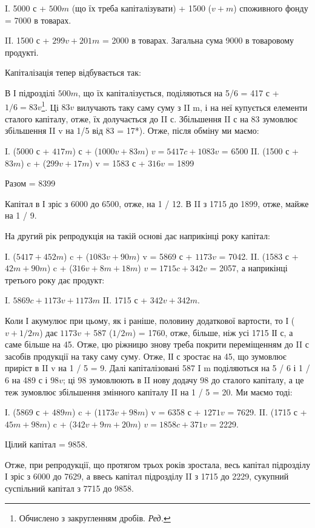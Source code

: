 I.  5000 с + $500 m$ (що їх треба капіталізувати) + 1500 ($v + m$) споживного
фонду = 7000 в товарах.

II.    1500 с + $299 v + 201 m$ = 2000 в товарах. Загальна сума 9000 в
товаровому продукті.

Капіталізація тепер відбувається так:

В І підрозділі $500 m$, що їх капіталізується, поділяються на 5/6 =
417 с + $1 / 6 = 83 v$\footnote*{
Обчислено з закругленням дробів. \emph{Ред.}
}. Ці $83 v$ вилучають таку саму суму з II m, і на
неї купується елементи сталого капіталу, отже, їх долучається до II с.
Збільшення II с на 83 зумовлює збільшення II v на 1/5 від 83 = 17*).
Отже, після обміну ми маємо:

I. (5000 с + $417 m$) с + ($1000 v + 83 m$) $v = 5417 c + 1083 v$ = 6500
II. (1500 с + $83 m$) c + ($299 v + 17 m$) v = 1583 с + $316 v$ = 1899

Разом = 8399

Капітал в І зріс з 6000 до 6500, отже, на 1 / 12. В II з 1715 до 1899,
отже, майже на 1 / 9.

На другий рік репродукція на такій основі дає наприкінці року
капітал:

І. ($5417 + 452 m$) c + ($1083 v + 90 m$) v = 5869 с + $1173 v$ = 7042.
II. (1583 с + $42 m + 90 m$) c + ($316 v + 8m + 18 m$) $v = 1715 c + 342 v$ =
2057,
а наприкінці третього року дає продукт:

I. $5869 c + 1173 v + 1173 m$
II. 1715 с + $342 v + 342 m$.

Коли І акумулює при цьому, як і раніше, половину додаткової вартости,
то І ($v + 1 / 2 m$) дає $1173 v$ + 587 ($1 / 2 m$) = 1760, отже, більше,
ніж усі 1715 ІІ с, а саме більше на 45. Отже, цю ріжницю знову треба
покрити переміщенням до II с засобів продукції на таку саму суму. Отже,
ІІ с зростає на 45, що зумовлює приріст в II v на 1 / 5 = 9. Далі капіталізовані
587 I m поділяються на 5 / 6 і 1 / 6 на 489 с і $98 v$; ці 98 зумовлюють
в II нову додачу 98 до сталого капіталу, а це теж зумовлює
збільшення змінного капіталу II на 1 / 5 = 20. Ми маємо тоді:

І. (5869 с + $489 m$) c + ($1173 v + 98 m$) v = 6358 с + $1271 v$ = 7629.
II. (1715 с + $45 m + 98 m$) c + ($342 v + 9 m + 20 m$) $v = 1858 c + 371 v$ = 2229.

Цілий капітал = 9858.

Отже, при репродукції, що протягом трьох років зростала,
весь капітал підрозділу І зріс з 6000 до 7629, а ввесь капітал підрозділу
II з 1715 до 2229, сукупний суспільний капітал з 7715 до 9858.

